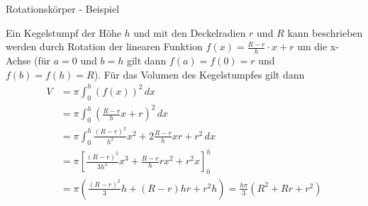 \begin{frame}{Rotationskörper - Beispiel}
\small{	\begin{example}
		Ein Kegelstumpf der Höhe $h$ und mit den Deckelradien $r$ und $R$ kann beschrieben werden durch Rotation der linearen Funktion $f(x)= \frac{R-r}{h} \cdot x + r$ um die x-Achse (für $a=0$ und $b=h$ gilt dann $f(a)=f(0)=r$ und $f(b)=f(h)=R$).
		Für das Volumen des Kegelstumpfes gilt dann
		\begin{align*}
			V & = \pi \int_{0}^{h} \left( f(x) \right)^2 \, dx \\
			& = \pi \int_{0}^{h} \left( \frac{R-r}{h} x +r \right)^{2}\, dx \\
			& = \pi \int_{0}^{h} \frac{(R-r)^2}{h^2} x^2  +2 \frac{R-r}{h}xr +r^2 \, dx \\
			& = \pi \left[ \frac{(R-r)^2}{3h^2} x^3  + \frac{R-r}{h}rx^{2} +r^2 x \right]_{0}^{h} \\
			& = \pi \left( \frac{(R-r)^2}{3}h + (R-r)hr + r^2 h \right) = \frac{h \pi}{3} (R^2 + Rr +r^2 ) 
		\end{align*}
	\end{example}}
\end{frame}

